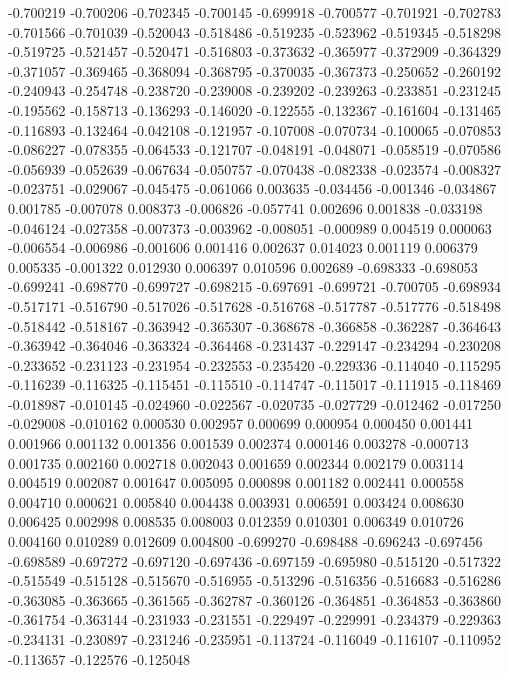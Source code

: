-0.700219
-0.700206
-0.702345
-0.700145
-0.699918
-0.700577
-0.701921
-0.702783
-0.701566
-0.701039
-0.520043
-0.518486
-0.519235
-0.523962
-0.519345
-0.518298
-0.519725
-0.521457
-0.520471
-0.516803
-0.373632
-0.365977
-0.372909
-0.364329
-0.371057
-0.369465
-0.368094
-0.368795
-0.370035
-0.367373
-0.250652
-0.260192
-0.240943
-0.254748
-0.238720
-0.239008
-0.239202
-0.239263
-0.233851
-0.231245
-0.195562
-0.158713
-0.136293
-0.146020
-0.122555
-0.132367
-0.161604
-0.131465
-0.116893
-0.132464
-0.042108
-0.121957
-0.107008
-0.070734
-0.100065
-0.070853
-0.086227
-0.078355
-0.064533
-0.121707
-0.048191
-0.048071
-0.058519
-0.070586
-0.056939
-0.052639
-0.067634
-0.050757
-0.070438
-0.082338
-0.023574
-0.008327
-0.023751
-0.029067
-0.045475
-0.061066
0.003635
-0.034456
-0.001346
-0.034867
0.001785
-0.007078
0.008373
-0.006826
-0.057741
0.002696
0.001838
-0.033198
-0.046124
-0.027358
-0.007373
-0.003962
-0.008051
-0.000989
0.004519
0.000063
-0.006554
-0.006986
-0.001606
0.001416
0.002637
0.014023
0.001119
0.006379
0.005335
-0.001322
0.012930
0.006397
0.010596
0.002689
-0.698333
-0.698053
-0.699241
-0.698770
-0.699727
-0.698215
-0.697691
-0.699721
-0.700705
-0.698934
-0.517171
-0.516790
-0.517026
-0.517628
-0.516768
-0.517787
-0.517776
-0.518498
-0.518442
-0.518167
-0.363942
-0.365307
-0.368678
-0.366858
-0.362287
-0.364643
-0.363942
-0.364046
-0.363324
-0.364468
-0.231437
-0.229147
-0.234294
-0.230208
-0.233652
-0.231123
-0.231954
-0.232553
-0.235420
-0.229336
-0.114040
-0.115295
-0.116239
-0.116325
-0.115451
-0.115510
-0.114747
-0.115017
-0.111915
-0.118469
-0.018987
-0.010145
-0.024960
-0.022567
-0.020735
-0.027729
-0.012462
-0.017250
-0.029008
-0.010162
0.000530
0.002957
0.000699
0.000954
0.000450
0.001441
0.001966
0.001132
0.001356
0.001539
0.002374
0.000146
0.003278
-0.000713
0.001735
0.002160
0.002718
0.002043
0.001659
0.002344
0.002179
0.003114
0.004519
0.002087
0.001647
0.005095
0.000898
0.001182
0.002441
0.000558
0.004710
0.000621
0.005840
0.004438
0.003931
0.006591
0.003424
0.008630
0.006425
0.002998
0.008535
0.008003
0.012359
0.010301
0.006349
0.010726
0.004160
0.010289
0.012609
0.004800
-0.699270
-0.698488
-0.696243
-0.697456
-0.698589
-0.697272
-0.697120
-0.697436
-0.697159
-0.695980
-0.515120
-0.517322
-0.515549
-0.515128
-0.515670
-0.516955
-0.513296
-0.516356
-0.516683
-0.516286
-0.363085
-0.363665
-0.361565
-0.362787
-0.360126
-0.364851
-0.364853
-0.363860
-0.361754
-0.363144
-0.231933
-0.231551
-0.229497
-0.229991
-0.234379
-0.229363
-0.234131
-0.230897
-0.231246
-0.235951
-0.113724
-0.116049
-0.116107
-0.110952
-0.113657
-0.122576
-0.125048
